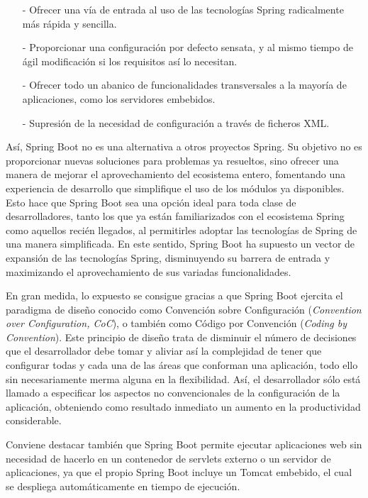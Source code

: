 \documentclass[a4paper]{article}
\begin{document}
    \begin{itemize}
    	\item[-] Ofrecer una vía de entrada al uso de las tecnologías Spring radicalmente más rápida y sencilla.
    	\item[-] Proporcionar una configuración por defecto sensata, y al mismo tiempo de ágil modificación si los requisitos así lo necesitan.
    	\item[-] Ofrecer todo un abanico de funcionalidades transversales a la mayoría de aplicaciones, como los servidores embebidos.
    	\item[-] Supresión de la necesidad de configuración a través de ficheros XML.
    \end{itemize}
    
    Así, Spring Boot no es una alternativa a otros proyectos Spring. Su objetivo no es proporcionar nuevas soluciones para problemas ya resueltos, sino ofrecer una manera de mejorar el aprovechamiento del ecosistema entero, fomentando una experiencia de desarrollo que simplifique el uso de los módulos ya disponibles. Esto hace que Spring Boot sea una opción ideal para toda clase de desarrolladores, tanto los que ya están familiarizados con el ecosistema Spring como aquellos recién llegados, al permitirles adoptar las tecnologías de Spring de una manera simplificada. En este sentido, Spring Boot ha supuesto un vector de expansión de las tecnologías Spring, disminuyendo su barrera de entrada y maximizando el aprovechamiento de sus variadas funcionalidades.
    
    En gran medida, lo expuesto se consigue gracias a que Spring Boot ejercita el paradigma de diseño conocido como Convención sobre Configuración (\emph{Convention over Configuration, CoC}), o también como Código por Convención (\emph{Coding by Convention}). Este principio de diseño trata de disminuir el número de decisiones que el desarrollador debe tomar y aliviar así la complejidad de tener que configurar todas y cada una de las áreas que conforman una aplicación, todo ello sin necesariamente merma alguna en la flexibilidad. Así, el desarrollador sólo está llamado a especificar los aspectos no convencionales de la configuración de la aplicación, obteniendo como resultado inmediato un aumento en la productividad considerable.
    
    Conviene destacar también que Spring Boot permite ejecutar aplicaciones web sin necesidad de hacerlo en un contenedor de servlets externo o un servidor de aplicaciones, ya que el propio Spring Boot incluye un Tomcat embebido, el cual se despliega automáticamente en tiempo de ejecución.
    
\end{document}

